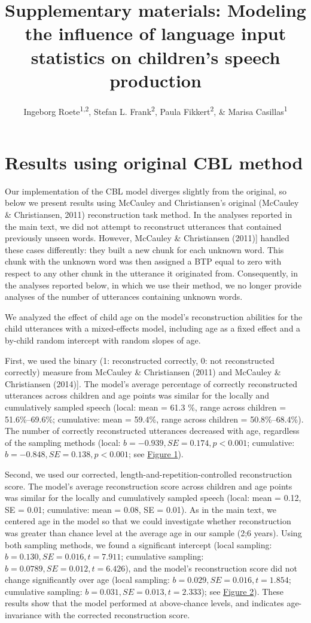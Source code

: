 \documentclass[man,mask,floatsintext]{apa6}
\affiliation{
\vspace{0.5cm}
\textsuperscript{1} Max Planck Institute for Psycholinguistics\\\textsuperscript{2} Radboud University}
\title{Supplementary materials: Modeling the influence of language input
statistics on children's speech production}
\author{Ingeborg Roete\textsuperscript{1,2}, Stefan L. Frank\textsuperscript{2},
Paula Fikkert\textsuperscript{2}, \& Marisa Casillas\textsuperscript{1}}
\date{}
\begin{document}
\maketitle

\section{Results using original CBL
method}\label{results-using-original-cbl-method}

Our implementation of the CBL model diverges slightly from the original,
so below we present results using McCauley and Christiansen's original
(McCauley \& Christiansen, 2011) reconstruction task method. In the
analyses reported in the main text, we did not attempt to reconstruct
utterances that contained previously unseen words. However, McCauley \&
Christiansen (2011){]} handled these cases differently: they built a new
chunk for each unknown word. This chunk with the unknown word was then
assigned a BTP equal to zero with respect to any other chunk in the
utterance it originated from. Consequently, in the analyses reported
below, in which we use their method, we no longer provide analyses of
the number of utterances containing unknown words.

We analyzed the effect of child age on the model's reconstruction
abilities for the child utterances with a mixed-effects model, including
age as a fixed effect and a by-child random intercept with random slopes
of age.

First, we used the binary (1: reconstructed correctly, 0: not
reconstructed correctly) measure from McCauley \& Christiansen (2011)
and McCauley \& Christiansen (2014){]}. The model's average percentage
of correctly reconstructed utterances across children and age points was
similar for the locally and cumulatively sampled speech (local: mean =
61.3 \%, range across children = 51.6\%--69.6\%; cumulative: mean =
59.4\%, range across children = 50.8\%--68.4\%). The number of correctly
reconstructed utterances decreased with age, regardless of the sampling
methods (local: \(b = -0.939, SE = 0.174, p < 0.001\); cumulative:
\(b = -0.848, SE = 0.138, p < 0.001\); see
\protect\hyperlink{smfig1}{Figure 1}).

Second, we used our corrected, length-and-repetition-controlled
reconstruction score. The model's average reconstruction score across
children and age points was similar for the locally and cumulatively
sampled speech (local: mean = 0.12, SE = 0.01; cumulative: mean = 0.08,
SE = 0.01). As in the main text, we centered age in the model so that we
could investigate whether reconstruction was greater than chance level
at the average age in our sample (2;6 years). Using both sampling
methods, we found a significant intercept (local sampling:
\(b = 0.130, SE = 0.016, t = 7.911\); cumulative sampling:
\(b = 0.0789, SE = 0.012, t = 6.426\)), and the model's reconstruction
score did not change significantly over age (local sampling:
\(b = 0.029, SE = 0.016, t = 1.854\); cumulative sampling:
\(b = 0.031, SE = 0.013, t = 2.333\)); see
\protect\hyperlink{smfig2}{Figure 2}). These results show that the model
performed at above-chance levels, and indicates age-invariance with the
corrected reconstruction score.
\end{document}
